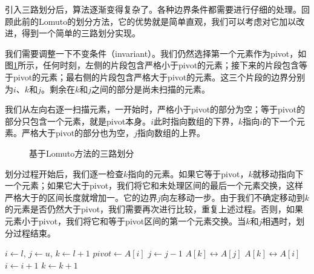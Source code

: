 \documentclass[UTF8]{article}
\begin{document}
引入三路划分后，算法逐渐变得复杂了。各种边界条件都需要进行仔细的处理。回顾此前的Lomuto的划分方法，它的优势就是简单直观，我们可以考虑对它加以改进，得到一个简单的三路划分实现。

我们需要调整一下不变条件（invariant）。我们仍然选择第一个元素作为pivot，如图\ref{fig:partition-3-way-lomuto}所示，任何时刻，左侧的片段包含严格小于pivot的元素；接下来的片段包含等于pivot的元素；最右侧的片段包含严格大于pivot的元素。这三个片段的边界分别为$i$、$k$和$j$。剩余在$k$和$j$之间的部分是尚未扫描的元素。

我们从左向右逐一扫描元素，一开始时，严格小于pivot的部分为空；等于pivot的部分只包含一个元素，就是pivot本身。$i$此时指向数组的下界，$k$指向$i$的下一个元素。严格大于pivot的部分也为空，$j$指向数组的上界。

\begin{figure}[htbp]
   \centering
   \caption{基于Lomuto方法的三路划分}
   \label{fig:partition-3-way-lomuto}
\end{figure}

划分过程开始后，我们逐一检查$k$指向的元素。如果它等于pivot，$k$就移动指向下一个元素；如果它大于pivot，我们将它和未处理区间的最后一个元素交换，这样严格大于的区间长度就增加一。它的边界$j$向左移动一步。由于我们不确定移动到$k$的元素是否仍然大于pivot，我们需要再次进行比较，重复上述过程。否则，如果元素小于pivot，我们将它和等于pivot区间的第一个元素交换。当$k$和$j$相遇时，划分过程结束。

\begin{algorithmic}[1]
    \State $i \gets l$, $j \gets u$, $k \gets l + 1$
    \State $pivot \gets A[i]$
        \State $j \gets j - 1$
        \State {} $A[k] \leftrightarrow A[j]$
      \EndWhile
        \State {} $A[k] \leftrightarrow A[i]$
        \State $i \gets i + 1$
      \EndIf
      \State $k \gets k + 1$
    \EndWhile
    \State {}
    \State {}
  \EndIf
\EndProcedure
\end{algorithmic}
\end{document}
